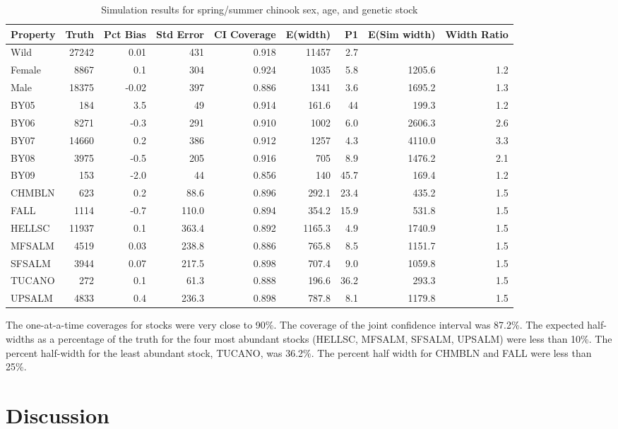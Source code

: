 \documentclass[%
                leqno,         %
%
]{nrc1}                          %
\begin{document}
\begin{table} %
\caption{Simulation results for spring/summer chinook sex, age, and genetic stock}
\label{table:CHsimresults}
\footnotesize
\begin{tabular}{ | l | r | r | r | r | r | r | r | r | }
\hline
Property&Truth&Pct Bias&Std Error&CI Coverage&E(width)&P1&E(Sim width)&Width Ratio \\ \hline
Wild&27242&0.01&431&0.918&11457&2.7&& \\ \hline
Female&8867&0.1&304&0.924&1035&5.8&1205.6&1.2 \\ \hline
Male&18375&-0.02&397&0.886&1341&3.6&1695.2&1.3 \\ \hline
BY05&184&3.5&49&0.914&161.6&44&199.3&1.2 \\ \hline
BY06&8271&-0.3&291&0.910&1002&6.0&2606.3&2.6 \\ \hline
BY07&14660&0.2&386&0.912&1257&4.3&4110.0&3.3 \\ \hline
BY08&3975&-0.5&205&0.916&705&8.9&1476.2&2.1 \\ \hline
BY09&153&-2.0&44&0.856&140&45.7&169.4&1.2 \\ \hline
CHMBLN&623&0.2&88.6&0.896&292.1&23.4&435.2&1.5 \\ \hline
FALL&1114&-0.7&110.0&0.894&354.2&15.9&531.8&1.5 \\ \hline
HELLSC&11937&0.1&363.4&0.892&1165.3&4.9&1740.9&1.5 \\ \hline
MFSALM&4519&0.03&238.8&0.886&765.8&8.5&1151.7&1.5 \\ \hline
SFSALM&3944&0.07&217.5&0.898&707.4&9.0&1059.8&1.5 \\ \hline
TUCANO&272&0.1&61.3&0.888&196.6&36.2&293.3&1.5 \\ \hline
UPSALM&4833&0.4&236.3&0.898&787.8&8.1&1179.8&1.5 \\ \hline
\end{tabular}
\end{table}

The one-at-a-time coverages for stocks were very close to 90\%. The coverage of the joint confidence interval was 87.2\%. The expected half-widths as a percentage of the truth for the four most abundant stocks (HELLSC, MFSALM, SFSALM, UPSALM) were less than 10\%. The percent half-width for the least abundant stock, TUCANO, was 36.2\%. The percent half width for CHMBLN and FALL were less than 25\%.

\section*{Discussion}	
\end{document}
